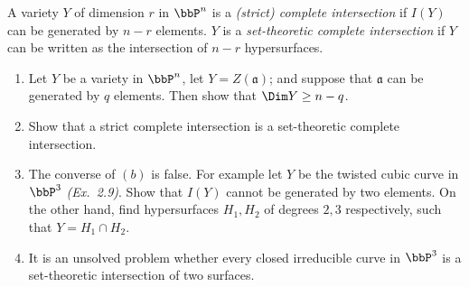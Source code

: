 \begin{exercise}[2.17]
    A variety $Y$ of dimension $r$ in $\bbP^n$ is a \emph{(strict) complete
    intersection} if $I(Y)$ can be generated by $n-r$ elements. $Y$ is a
    \emph{set-theoretic complete intersection} if $Y$ can be written as the
    intersection of $n-r$ hypersurfaces.
    \begin{enumerate}
    \item Let $Y$ be a variety in $\bbP^n$, let $Y = Z(\mathfrak{a})$; and
    suppose that $\mathfrak{a}$ can be generated by $q$ elements. Then show
    that $\Dim Y \ge n-q$. 
    \item Show that a strict complete intersection is a set-theoretic complete
    intersection.
    \item The converse of $(b)$ is false. For example let $Y$ be the twisted
    cubic curve in $\bbP^3$ {\emph{(Ex.\ 2.9)}}. Show that
    $I(Y)$ cannot be generated by two elements. On the other hand, find
    hypersurfaces $H_1,H_2$ of degrees $2,3$ respectively, such that
    $Y = H_1 \cap H_2$. 
    \item It is an unsolved problem whether every closed irreducible curve in
    $\bbP^3$ is a set-theoretic intersection of two surfaces.
    \end{enumerate}
\end{exercise}
